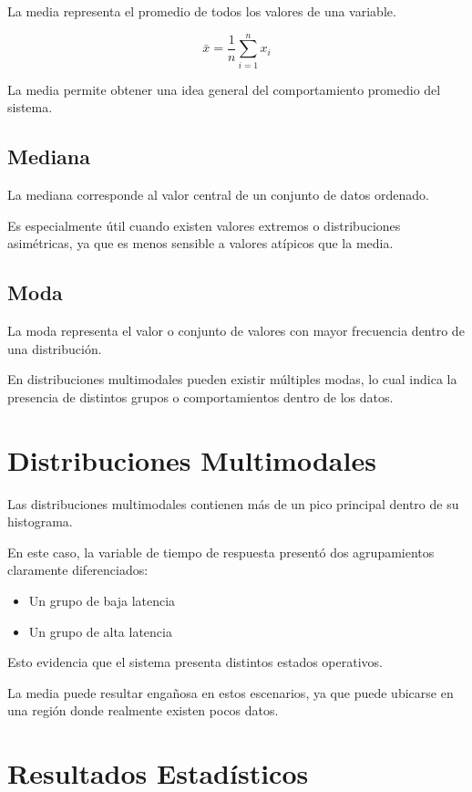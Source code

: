 \documentclass[12pt]{article}
\begin{document}
La media representa el promedio de todos los valores de una variable.

\[
\bar{x} = \frac{1}{n}\sum_{i=1}^{n}x_i
\]

La media permite obtener una idea general del comportamiento promedio del
sistema.

\subsection{Mediana}

La mediana corresponde al valor central de un conjunto de datos ordenado.

Es especialmente útil cuando existen valores extremos o distribuciones
asimétricas, ya que es menos sensible a valores atípicos que la media.

\subsection{Moda}

La moda representa el valor o conjunto de valores con mayor frecuencia dentro
de una distribución.

En distribuciones multimodales pueden existir múltiples modas, lo cual indica
la presencia de distintos grupos o comportamientos dentro de los datos.


\section{Distribuciones Multimodales}

Las distribuciones multimodales contienen más de un pico principal dentro de
su histograma.

En este caso, la variable de tiempo de respuesta presentó dos agrupamientos
claramente diferenciados:

\begin{itemize}
    \item Un grupo de baja latencia
    \item Un grupo de alta latencia
\end{itemize}

Esto evidencia que el sistema presenta distintos estados operativos.

La media puede resultar engañosa en estos escenarios, ya que puede ubicarse en
una región donde realmente existen pocos datos.


\section{Resultados Estadísticos}
\end{document}
